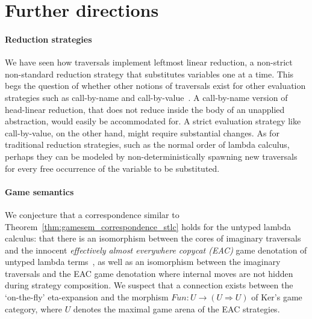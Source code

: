 \documentclass{elsarticle}
\theoremstyle{plain}
\theoremstyle{definition}
\newcommand{\travulc}{\travset}
\newcommand\pathset{{\mathcal{P}aths}} %
\begin{document}

\section{Further directions}

\paragraph{Reduction strategies} We have seen how traversals implement leftmost linear reduction,
a non-strict non-standard reduction strategy that substitutes variables one at a time. This begs the question of whether other notions of traversals
exist for other evaluation strategies such as call-by-name and call-by-value~\cite{plotkin-75}. A call-by-name version of head-linear reduction, that does not reduce inside the body of an unapplied abstraction, would easily be accommodated for. A strict evaluation strategy like call-by-value, on the other hand, might require substantial changes. As for traditional reduction strategies, such as the normal order of lambda calculus,
perhaps they can be modeled by non-deterministically spawning new traversals for every free occurrence of the variable to be substituted.

\paragraph{Game semantics} We conjecture that a correspondence similar
to Theorem~\ref{thm:gamesem_correspondence_stlc} holds for
the untyped lambda calculus: that there is an isomorphism between the cores of imaginary traversals and the innocent \emph{effectively almost everywhere copycat (EAC)} game denotation of untyped lambda terms~\cite{KerThesis}, as well as an isomorphism between the imaginary traversals and the EAC game denotation where internal moves are not hidden during strategy composition. We suspect that a connection exists between the `on-the-fly' eta-expansion  and the morphism $Fun : U \rightarrow (U \Rightarrow U)$ of Ker's game category, where $U$ denotes the maximal game arena of the EAC strategies.
\end{document}

